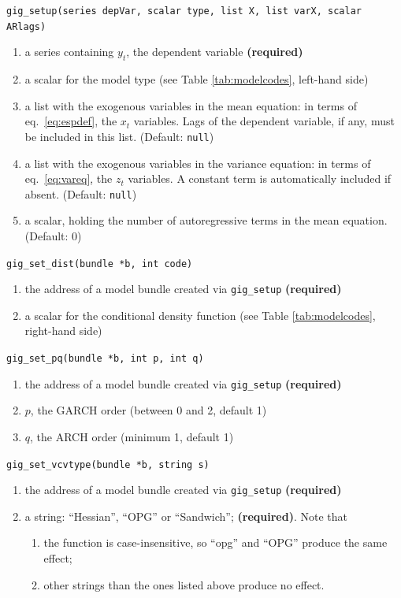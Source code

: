 \documentclass[a4paper,11pt]{article}
\newenvironment{funcdoc}[1]
{\noindent\hrulefill\newline\texttt{#1}\par\noindent\hrulefill\par\medskip\par}
{\bigskip}
\begin{document}
\begin{funcdoc}{gig\_setup(series depVar, scalar type, list X, 
			  list varX, scalar ARlags)}
\begin{enumerate}
\item a series containing $y_t$, the dependent variable \textbf{(required)}
\item a scalar for the model type (see Table \ref{tab:modelcodes},
  left-hand side)
\item a list with the exogenous variables in the mean equation: in
  terms of eq.~\eqref{eq:espdef}, the $x_t$ variables. Lags of the
  dependent variable, if any, must be included in this list. (Default:
  \texttt{null})
\item a list with the exogenous variables in the variance equation: in
  terms of eq.~\eqref{eq:vareq}, the $z_t$ variables. A constant term
  is automatically included if absent. (Default: \texttt{null})
\item a scalar, holding the number of autoregressive terms in the mean
  equation. (Default: 0)
\end{enumerate}
\end{funcdoc}

\begin{funcdoc}{gig\_set\_dist(bundle *b, int code)}
\begin{enumerate}
\item the address of a model bundle created via \texttt{gig\_setup}
  \textbf{(required)}
\item a scalar for the conditional density function (see Table \ref{tab:modelcodes},
  right-hand side)
\end{enumerate}
\end{funcdoc}

\begin{funcdoc}{gig\_set\_pq(bundle *b, int p, int q)}
\begin{enumerate}
\item the address of a model bundle created via \texttt{gig\_setup}
  \textbf{(required)}
\item  $p$, the GARCH order (between 0 and 2, default 1)
\item  $q$, the ARCH order (minimum 1, default 1)
\end{enumerate}
\end{funcdoc}

\begin{funcdoc}{gig\_set\_vcvtype(bundle *b, string s)}
\begin{enumerate}
\item the address of a model bundle created via \texttt{gig\_setup}
  \textbf{(required)}
\item  a string: ``Hessian'', ``OPG'' or ``Sandwich'';
  \textbf{(required)}. Note that
  \begin{enumerate}
  \item the function is case-insensitive, so ``opg'' and ``OPG''
    produce the same effect;
  \item other strings than the ones listed above produce no effect.
  \end{enumerate}
\end{enumerate}
\end{funcdoc}
\end{document}
